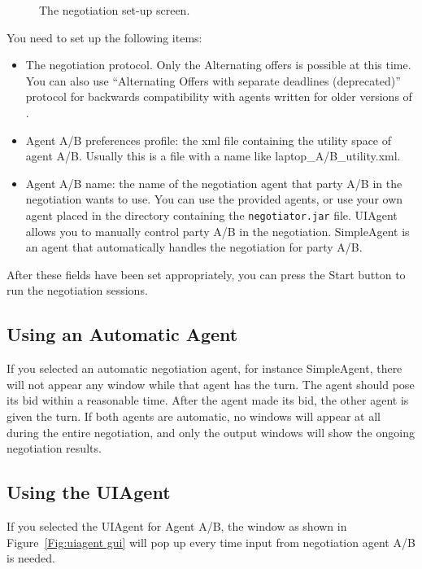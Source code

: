 \documentclass[]{article}
\begin{document}
\begin{figure}
\caption{The negotiation set-up screen.}\label{Fig:negotiation set-up}
\end{figure}

You need to set up the following items:
\begin{itemize}
	\item The negotiation protocol. Only the Alternating offers is possible at this time. You can also use ``Alternating Offers with separate deadlines (deprecated)'' protocol for backwards compatibility with agents written for older versions of \Genius.
	\item Agent A/B preferences profile: the xml file containing the utility space of agent A/B. Usually this is a file with a name like laptop\_A/B\_utility.xml.
	\item Agent A/B name: the name of the negotiation agent that party A/B in the negotiation wants to use. You can use the provided agents, or use your own agent placed in the directory containing the \texttt{negotiator.jar} file. UIAgent allows you to manually control party A/B in the negotiation. SimpleAgent is an agent that automatically handles the negotiation for party A/B.
\end{itemize}

After these fields have been set appropriately, you can press the Start button to run the negotiation sessions.

\subsection{Using an Automatic Agent}

If you selected an automatic negotiation agent, for instance SimpleAgent, there will not appear any window while that agent has the turn. The agent should pose its bid within a reasonable time. After the agent made its bid, the other agent is given the turn. If both agents are automatic, no windows will appear at all during the entire negotiation, and only the output windows will show the ongoing negotiation results.

\subsection{Using the UIAgent}

If you selected the UIAgent for Agent A/B, the window as shown in Figure~\ref{Fig:uiagent gui} will pop up every time input from negotiation agent A/B is needed.
\end{document}
